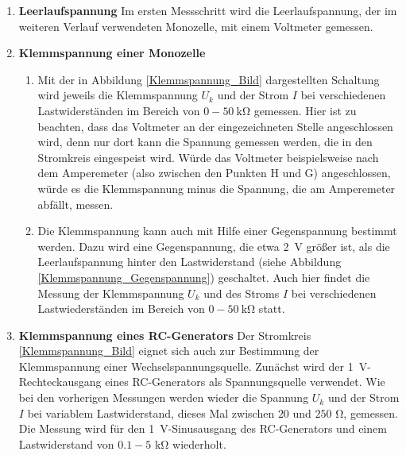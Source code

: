 \begin{enumerate}
\item \textbf{Leerlaufspannung} Im ersten Messschritt wird die Leerlaufspannung, der im weiteren Verlauf verwendeten Monozelle, mit einem Voltmeter gemessen.
\item \textbf{Klemmspannung einer Monozelle}
\begin{enumerate}[label=\alph*)]
	\item Mit der in Abbildung \ref{Klemmspannung_Bild} dargestellten Schaltung wird jeweils die Klemmspannung $U_k$ und der Strom $I$ bei verschiedenen Lastwiderständen im Bereich von $0-50\ \si{\kilo\ohm}$ gemessen. Hier ist zu beachten, dass das Voltmeter an der eingezeichneten Stelle angeschlossen wird, denn nur dort kann die Spannung gemessen werden, die in den Stromkreis eingespeist wird. Würde das Voltmeter beispielsweise nach dem Amperemeter (also zwischen den Punkten H und G) angeschlossen, würde es die Klemmspannung minus die Spannung, die am Amperemeter abfällt, messen.
	\item Die Klemmspannung kann auch mit Hilfe einer Gegenspannung bestimmt werden. Dazu wird eine Gegenspannung, die etwa \SI{2}{\volt} größer ist, als die Leerlaufspannung hinter den Lastwiderstand (siehe Abbildung \ref{Klemmspannung_Gegenspannung}) geschaltet. Auch hier findet die Messung der Klemmspannung $U_k$ und des Stroms $I$ bei verschiedenen Lastwiederständen im Bereich von $0-50\ \si{\kilo\ohm}$ statt.
\end{enumerate}

\item \textbf{Klemmspannung eines RC-Generators} Der Stromkreis \ref{Klemmspannung_Bild} eignet sich auch zur Bestimmung der Klemmspannung einer Wechselspannungsquelle. Zunächst wird der \SI{1}{\volt}-Rechteckausgang eines RC-Generators als Spannungsquelle verwendet. Wie bei den vorherigen Messungen werden wieder die Spannung $U_k$ und der Strom $I$ bei variablem Lastwiderstand, dieses Mal zwischen $20$ und $250$ \si{\ohm}, gemessen. Die Messung wird für den \SI{1}{\volt}-Sinusausgang des RC-Generators und einem Lastwiderstand von $0.1-5$ \si{\kilo\ohm} wiederholt.
\end{enumerate}
